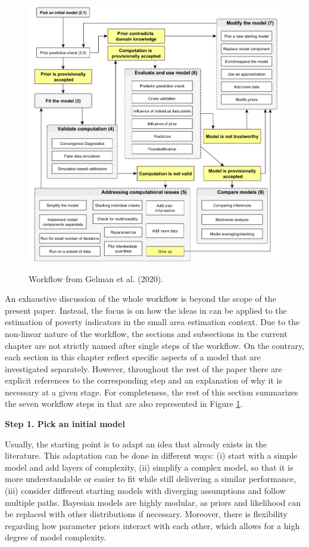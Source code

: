 \begin{figure}
    \includegraphics[width=16cm]{./graphics/workflow}
    \label{fig:gelman_wf}
    \caption{Workflow from Gelman et al. (2020).}
\end{figure}


An exhaustive discussion of the whole workflow is beyond the scope of the present paper.
Instead, the focus is on how the ideas in \cite{gelman_bayesian_2020} can be applied to the estimation of poverty indicators in the small area estimation context.
Due to the non-linear nature of the workflow, the sections and subsections in the current chapter are not strictly named after single steps of the workflow.
On the contrary, each section in this chapter reflect specific aspects of a model that are investigated separately.
However, throughout the rest of the paper there are explicit references to the corresponding step and an explanation of why it is necessary at a given stage.
For completeness, the rest of this section summarizes the seven workflow steps in \cite{gelman_bayesian_2020} that are also represented in Figure \ref{fig:gelman_wf}.

\textbf{Step 1. Pick an initial model}

Usually, the starting point is to adapt an idea that already exists in the literature.
This adaptation can be done in different ways: (i) start with a simple model and add layers of complexity, (ii) simplify a complex model, so that it is more understandable or easier to fit while still delivering a similar performance, (iii) consider different starting models with diverging assumptions and follow multiple paths.
Bayesian models are highly modular, as priors and likelihood can be replaced with other distributions if necessary.
Moreover, there is flexibility regarding how parameter priors interact with each other, which allows for a high degree of model complexity.


